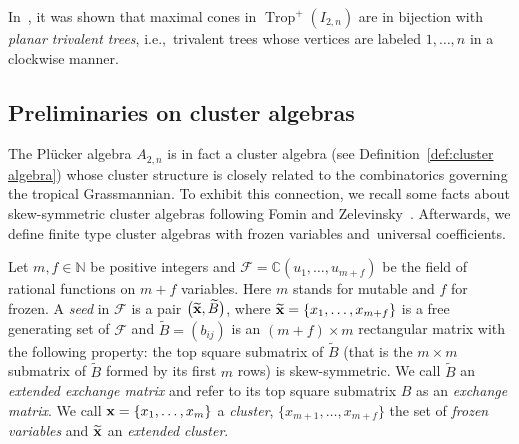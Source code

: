 \documentclass[10pt,a4paper]{amsart}
\numberwithin{equation}{section}
\DeclareMathOperator{\trop}{Trop}
\begin{document}
In~\cite[Section~5]{SW05}, it was shown that
maximal cones in $\trop^+(I_{2,n})$ are in bijection with {\it planar trivalent trees}, i.e.,~trivalent trees whose vertices are labeled $1,\dots,n$ in a clockwise manner.

\subsection{Preliminaries on cluster algebras}\label{sec:cluster}

The Pl\"ucker algebra $A_{2,n}$ is in fact a cluster algebra (see Definition~\ref{def:cluster algebra}) whose cluster structure is closely related to the combinatorics governing the tropical Grassmannian.
To exhibit this con\-nection, we recall some facts about skew-symmetric cluster algebras following Fomin and Zelevinsky~\cite{FZ02,FZ_clustersIV}.
Afterwards, we define finite type cluster algebras with frozen variables and~universal coefficients.

Let $m,f\in \mathbb N$ be positive integers and $\mathcal{F} =\mathbb{C}(u_1, \dots ,u_{m+f})$ be the field of rational functions on $m+f$ variables.
Here $m$ stands for mutable and $f$ for frozen.
A {\it seed} in $\mathcal{F}$ is a pair $\big(\widetilde{{\bf x}},\widetilde{B}\big)$, where $\widetilde{{\bf x}}=\{x_1,\dots, x_{m+f}\}$ is a free generating set of $\mathcal F$ and $\widetilde{B}=(b_{ij})$ is an $(m+f)\times m$ rectangular matrix with the following property: the top square submatrix of $\widetilde{B}$ (that is the $m\times m$ submatrix of $\widetilde{B}$ formed by its first $m$ rows) is skew-symmetric.
We call $\widetilde{B} $ an {\it extended exchange matrix} and refer to its top square submatrix $B$ as an {\it exchange matrix}.
We call ${\bf x}=\{x_1, \dots , x_m \}$ a {\it cluster}, $\{x_{m+1}, \dots , x_{m+f} \}$ the set of {\it frozen variables} and $\widetilde{{\bf x}}$ an {\it extended cluster}.
\end{document}
